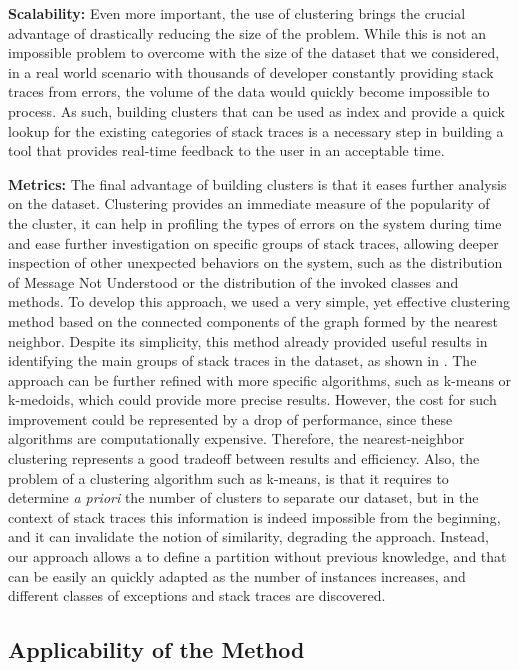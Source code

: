 \textbf{Scalability:} Even more important, the use of clustering brings the crucial advantage of drastically reducing the size of the problem. While this is not an impossible problem to overcome with the size of the dataset that we considered, in a real world scenario with thousands of developer constantly providing stack traces from errors, the volume of the data would quickly become impossible to process. As such, building clusters that can be used as index and provide a quick lookup for the existing categories of stack traces is a necessary step in building a tool that provides real-time feedback to the user in an acceptable time.

\textbf{Metrics:} The final advantage of building clusters is that it eases further analysis on the dataset. Clustering provides an immediate measure of the popularity of the cluster, it can help in profiling the types of errors on the system during time and ease further investigation on specific groups of stack traces, allowing deeper inspection of other unexpected behaviors on the system, such as the distribution of Message Not Understood or  the distribution of the invoked classes and methods. To develop this approach, we used a very simple, yet effective clustering method based on the connected components of the graph formed by the nearest neighbor. Despite its simplicity, this method already provided useful results in identifying the main groups of stack traces in the dataset, as shown in . The approach can be further refined with more specific algorithms, such as k-means\cite{MacQ1967} or k-medoids\cite{Kauf1987,Park2009}, which could provide more precise results. However, the cost for such improvement could be represented by a drop of performance, since these algorithms are computationally expensive. Therefore, the nearest-neighbor clustering  represents a good tradeoff between results and efficiency. Also, the problem of a clustering algorithm such as k-means, is that it requires to determine \emph{a priori} the number of clusters to separate our dataset, but in the context of stack traces this information is indeed impossible from the beginning, and it can invalidate the notion of similarity, degrading the approach. Instead, our approach allows a to define a partition without previous knowledge, and that can be easily an quickly adapted as the number of instances increases, and different classes of exceptions and stack traces are discovered.

\subsection{Applicability of the Method}

